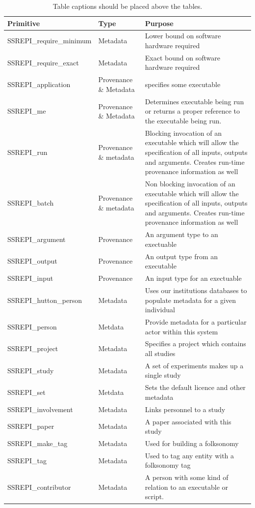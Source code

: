 \documentclass[runningheads]{llncs}
\begin{document}
\begin{table}
\caption{Table captions should be placed above the
tables.}\label{tab1}
    \begin{tabularx}{\textwidth}{|l|p{2cm}|p{6cm}|}
\hline
Primitive & Type & Purpose \\
\hline
        SSREPI\_require\_minimum & Metadata & Lower bound on software hardware required \\ SSREPI\_require\_exact & Metadata & Exact bound on software hardware required \\
        SSREPI\_application & Provenance \& Metadata & specifies some executable \\
        SSREPI\_me & Provenance \& Metadata & Determines executable being run or returns a proper reference to the executable being run. \\
        SSREPI\_run & Provenance \& metadata & Blocking invocation of an executable which will allow the specification of all inputs, outputs and arguments. Creates run-time provenance information as well \\
        SSREPI\_batch & Provenance \& metadata & Non blocking invocation of an executable which will allow the specification of all inputs, outputs and arguments. Creates run-time provenance information as well \\
        SSREPI\_argument & Provenance & An argument type to an exectuable \\
        SSREPI\_output & Provenance & An output type from an executable \\
        SSREPI\_input & Provenance & An input type for an exectuable \\
        SSREPI\_hutton\_person & Metadata & Uses our institutions databases to populate metadata for a given individual \\
        SSREPI\_person & Metdata & Provide metadata for a particular actor within this system\\
        SSREPI\_project & Metadata & Specifies a project which contains all studies \\
        SSREPI\_study & Metadata & A set of experiments makes up a single study \\
        SSREPI\_set & Metdata & Sets the default licence and other metadata \\
        SSREPI\_involvement & Metadata & Links personnel to a study \\
        SSREPI\_paper & Metadata & A paper associated with this study \\
        SSREPI\_make\_tag & Metadata & Used for building a folksonomy \\
        SSREPI\_tag & Metadata & Used to tag any entity with a folksonomy tag \\
        SSREPI\_contributor & Metadata & A  person with some kind of relation to an executable or script. \\


\end{tabularx}
\end{table}
\end{document}
